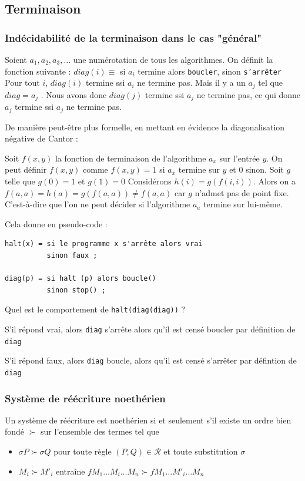 \subsection{Terminaison}
\subsubsection{Indécidabilité de la terminaison dans le cas "général"}
Soient $a_1,a_2 ,a_3 , \dots$ une numérotation de tous les algorithmes.
On définit la fonction suivante : $diag(i) \equiv $ si $a_i$ termine alors \texttt{boucler}, sinon \texttt{s'arrêter} \\

Pour tout $i$, $diag(i)$ termine ssi $a_i$ ne termine pas.
Mais il y a un $a_j$ tel que $diag = a_j$ . Nous avons donc
$diag(j)$ termine ssi $a_j$ ne termine pas, ce qui donne
$a_j$ termine ssi $a_j$ ne termine pas.


De manière peut-être plus formelle, en mettant en évidence la diagonalisation négative de Cantor :

Soit $f(x,y)$ la fonction de terminaison de l'algorithme $a_x$ sur l'entrée $y$.
On peut définir $f(x,y)$ comme $f(x,y) = 1$ si $a_x$ termine sur $y$ et $0$ sinon.
Soit $g$ telle que $g(0) = 1$ et $g(1) = 0$ 
Considérons $h(i) = g(f(i,i))$.
Alors on a $f(a,a) = h(a) = g(f(a,a)) \neq f(a,a)$ car $g$ n'admet pas de point fixe.
C'est-à-dire que l'on ne peut décider si l'algorithme $a_a$ termine sur lui-même. 

\vspace{0.5cm}

Cela donne en pseudo-code :
\begin{verbatim}
halt(x) = si le programme x s'arrête alors vrai 
          sinon faux ;

diag(p) = si halt (p) alors boucle()
          sinon stop() ;
\end{verbatim}
Quel est le comportement de \texttt{halt(diag(diag))} ?


S'il répond vrai, alors \texttt{diag} s'arrête alors qu'il est censé boucler par définition de \texttt{diag}


S'il répond faux, alors \texttt{diag} boucle, alors qu'il est censé s'arrêter par défintion de \texttt{diag}

\subsubsection{Système de réécriture noethérien}
Un système de réécriture est noethérien si et seulement s'il existe un ordre bien fondé
$\succ$ sur l'ensemble des termes tel que
\begin{itemize}
	\item[i)] $\sigma P \succ \sigma Q$ pour toute règle $(P,Q) \in \mathcal{R}$ et toute substitution $\sigma$
	\item[ii)] $M_i \succ M'_i$ entraîne $ fM_1\dots M_i \dots M_n \succ fM_1\dots M'_i \dots M_n $
\end{itemize}

